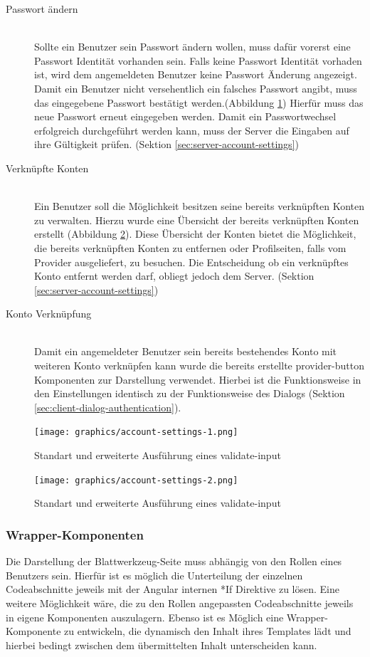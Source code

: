 \begin{description}
	\item[Passwort ändern]\hfill\\
	Sollte ein Benutzer sein Passwort ändern wollen, muss dafür vorerst eine Passwort Identität vorhanden sein. Falls keine Passwort Identität vorhaden ist, wird dem angemeldeten Benutzer keine Passwort Änderung angezeigt. Damit ein Benutzer nicht versehentlich ein falsches Passwort angibt, muss das eingegebene Passwort bestätigt werden.(Abbildung \ref{fig:account_settings_1}) Hierfür muss das neue Passwort erneut eingegeben werden. Damit ein Passwortwechsel erfolgreich durchgeführt werden kann, muss der Server die Eingaben auf ihre Gültigkeit prüfen. (Sektion \ref{sec:server-account-settings})
	\item[Verknüpfte Konten]\hfill\\
	Ein Benutzer soll die Möglichkeit besitzen seine bereits verknüpften Konten zu verwalten. Hierzu wurde eine Übersicht der bereits verknüpften Konten erstellt (Abbildung \ref{fig:account_settings_2}). Diese Übersicht der Konten bietet die Möglichkeit, die bereits verknüpften Konten zu entfernen oder Profilseiten, falls vom Provider ausgeliefert, zu besuchen. Die Entscheidung ob ein verknüpftes Konto entfernt werden darf, obliegt jedoch dem Server. (Sektion \ref{sec:server-account-settings})
	\item[Konto Verknüpfung]\hfill\\
	Damit ein angemeldeter Benutzer sein bereits bestehendes Konto mit weiteren Konto verknüpfen kann wurde die bereits erstellte provider-button Komponenten zur Darstellung verwendet. Hierbei ist die Funktionsweise in den Einstellungen identisch zu der Funktionsweise des Dialogs (Sektion \ref{sec:client-dialog-authentication}).
\end{description}

\begin{figure}
	\centering
	\texttt{[image: graphics/account-settings-1.png]}
	\caption{Standart und erweiterte Ausführung eines validate-input}
	\label{fig:account_settings_1}
\end{figure}

\begin{figure}
	\centering
	\texttt{[image: graphics/account-settings-2.png]}
	\caption{Standart und erweiterte Ausführung eines validate-input}
	\label{fig:account_settings_2}
\end{figure}

\subsubsection{Wrapper-Komponenten}
\label{sec:client-wrapper-components}
Die Darstellung der Blattwerkzeug-Seite muss abhängig von den Rollen eines Benutzers sein. Hierfür ist es möglich die Unterteilung der einzelnen Codeabschnitte jeweils mit der Angular internen *If Direktive zu lösen. Eine weitere Möglichkeit wäre, die zu den Rollen angepassten Codeabschnitte jeweils in eigene Komponenten auszulagern. Ebenso ist es Möglich eine Wrapper-Komponente zu entwickeln, die dynamisch den Inhalt ihres Templates lädt und hierbei bedingt zwischen dem übermittelten Inhalt unterscheiden kann.

